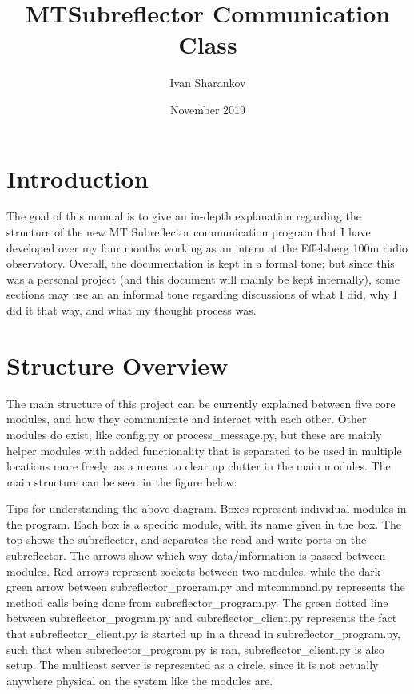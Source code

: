 \documentclass{article}
\title{MTSubreflector Communication Class}
\author{Ivan Sharankov }
\date{November 2019}
\begin{document}
\maketitle
\newpage

\tableofcontents
\newpage




\section{Introduction}

The goal of this manual is to give an in-depth explanation regarding the structure of the new MT Subreflector communication program that I have developed over my four months working as an intern at the Effelsberg 100m radio observatory.  Overall, the documentation  is kept in a formal tone; but since this was a personal project (and this document will mainly be kept internally), some sections may use an an informal tone regarding discussions of what I did, why I did it that way, and what my thought process was. 



\section{Structure Overview}

The main structure of this project can be currently explained between five core modules, and how they communicate and interact with each other. Other modules do exist, like config.py or process\_message.py, but these are mainly helper modules with added functionality that is separated to be used in multiple locations more freely, as a means to clear up clutter in the main modules. The main structure can be seen in the figure below:

 \vspace{10pt}
 \vspace{10pt}

Tips for understanding the above diagram. Boxes represent individual modules in the program. Each box is a specific module, with its name given in the box. The top shows the subreflector, and separates the read and write ports on the subreflector.  The arrows show which way data/information is passed between modules. Red arrows represent sockets between two modules, while the dark green arrow between subreflector\_program.py and mtcommand.py represents the method calls being done from subreflector\_program.py. The green dotted line between subreflector\_program.py and subreflector\_client.py represents the fact that subreflector\_client.py is started up in a thread in subreflector\_program.py, such that when subreflector\_program.py is ran, subreflector\_client.py is also setup. The multicast server is represented as a circle, since it is not actually anywhere physical on the system like the modules are.
\end{document}
